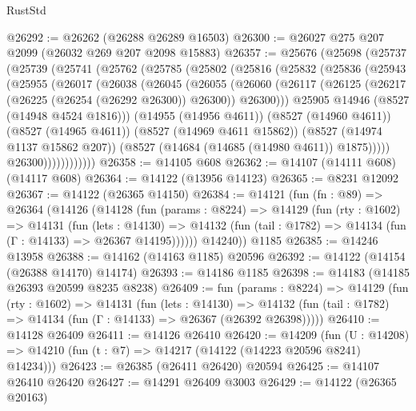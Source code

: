 \begin{lexlean}{RustStd}
\begin{coremodule}
@26292 := @26262 (@26288 @26289 @16503)
@26300 := @26027 @275 @207 @2099 (@26032 @269 @207 @2098 @15883)
@26357 := @25676
    (@25698
      (@25737
        (@25739
          (@25741
            (@25762
              (@25785
                (@25802
                  (@25816
                    (@25832
                      (@25836
                        (@25943
                          (@25955
                            (@26017
                              (@26038
                                (@26045
                                  (@26055
                                    (@26060
                                      (@26117
                                        (@26125
                                          (@26217 (@26225 (@26254 (@26292 @26300)) @26300))
                                          @26300)))
                                    @25905
                                    @14946
                                    (@8527 (@14948 @4524 @1816)))
                                  (@14955 (@14956 @4611))
                                  (@8527 (@14960 @4611))
                                  (@8527 (@14965 @4611))
                                  (@8527 (@14969 @4611 @15862))
                                  (@8527 (@14974 @1137 @15862 @207))
                                  (@8527 (@14684 (@14685 (@14980 @4611)) @1875)))))
                            @26300))))))))))))
@26358 := @14105 @608
@26362 := @14107 (@14111 @608) (@14117 @608)
@26364 := @14122 (@13956 @14123)
@26365 := @8231 @12092
@26367 := @14122 (@26365 @14150)
@26384 := @14121
    (fun (fn : @89) =>
    @26364
      (@14126
        (@14128
          (fun (params : @8224) =>
          @14129
            (fun (rty : @1602) =>
            @14131
              (fun (lets : @14130) =>
              @14132 (fun (tail : @1782) => @14134 (fun (Γ : @14133) => @26367 @14195))))))
        @14240))
    @1185
@26385 := @14246 @13958
@26388 := @14162 (@14163 @1185) @20596
@26392 := @14122 (@14154 (@26388 @14170) @14174)
@26393 := @14186 @1185
@26398 := @14183 (@14185 @26393 @20599 @8235 @8238)
@26409 := fun (params : @8224) =>
  @14129
    (fun (rty : @1602) =>
    @14131
      (fun (lets : @14130) =>
      @14132 (fun (tail : @1782) => @14134 (fun (Γ : @14133) => @26367 (@26392 @26398)))))
@26410 := @14128 @26409
@26411 := @14126 @26410
@26420 := @14209
    (fun (U : @14208) => @14210 (fun (t : @7) => @14217 (@14122 (@14223 @20596 @8241) @14234)))
@26423 := @26385 (@26411 @26420) @20594
@26425 := @14107 @26410 @26420
@26427 := @14291 @26409 @3003
@26429 := @14122 (@26365 @20163)

\end{coremodule}
\end{lexlean}
